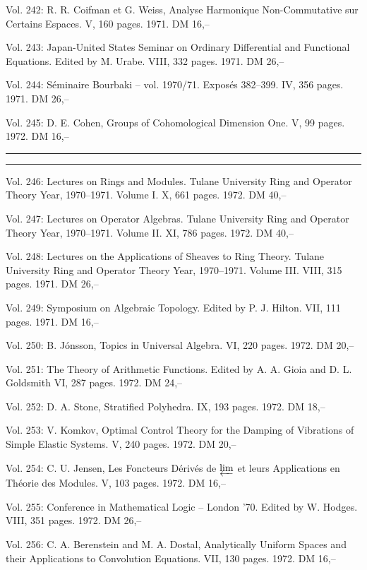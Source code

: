 Vol. 242: R. R. Coifman et G. Weiss, Analyse Harmonique Non-Commutative sur Certains Espaces. V, 160 pages. 1971. DM 16,--

Vol. 243: Japan-United States Seminar on Ordinary Differential and Functional Equations. Edited by M. Urabe. VIII, 332 pages. 1971. DM 26,--

Vol. 244: Séminaire Bourbaki -- vol. 1970/71. Exposés 382--399. IV, 356 pages. 1971. DM 26,--

Vol. 245: D. E. Cohen, Groups of Cohomological Dimension One. V, 99 pages. 1972. DM 16,--

\noindent\rule{\linewidth}{0.4pt}



\noindent\rule{\linewidth}{0.4pt}

Vol. 246: Lectures on Rings and Modules. Tulane University Ring and Operator Theory Year, 1970--1971. Volume I. X, 661 pages. 1972. DM 40,--

Vol. 247: Lectures on Operator Algebras. Tulane University Ring and Operator Theory Year, 1970--1971. Volume II. XI, 786 pages. 1972. DM 40,--

Vol. 248: Lectures on the Applications of Sheaves to Ring Theory. Tulane University Ring and Operator Theory Year, 1970--1971. Volume III. VIII, 315 pages. 1971. DM 26,--

Vol. 249: Symposium on Algebraic Topology. Edited by P. J. Hilton. VII, 111 pages. 1971. DM 16,--

Vol. 250: B. Jónsson, Topics in Universal Algebra. VI, 220 pages. 1972. DM 20,--

Vol. 251: The Theory of Arithmetic Functions. Edited by A. A. Gioia and D. L. Goldsmith VI, 287 pages. 1972. DM 24,--

Vol. 252: D. A. Stone, Stratified Polyhedra. IX, 193 pages. 1972. DM 18,--

Vol. 253: V. Komkov, Optimal Control Theory for the Damping of Vibrations of Simple Elastic Systems. V, 240 pages. 1972. DM 20,--

Vol. 254: C. U. Jensen, Les Foncteurs Dérivés de $\varprojlim$ et leurs Applications en Théorie des Modules. V, 103 pages. 1972. DM 16,--

Vol. 255: Conference in Mathematical Logic -- London '70. Edited by W. Hodges. VIII, 351 pages. 1972. DM 26,--

Vol. 256: C. A. Berenstein and M. A. Dostal, Analytically Uniform Spaces and their Applications to Convolution Equations. VII, 130 pages. 1972. DM 16,--

